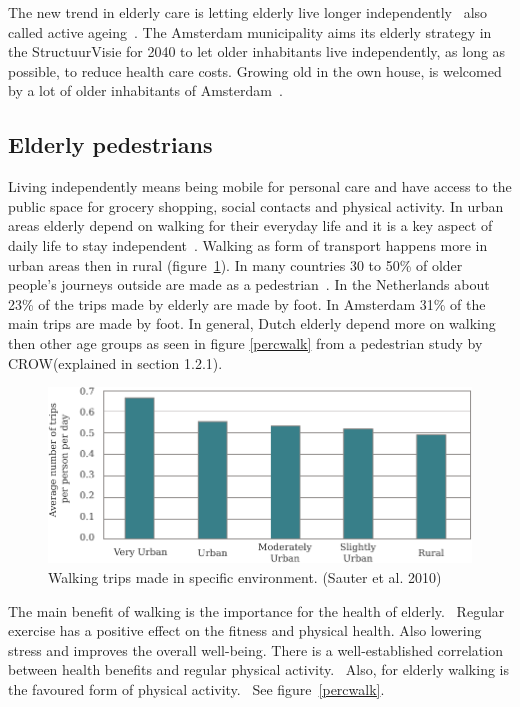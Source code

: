 The new trend in elderly care is letting elderly live longer independently~\cite{MENSenSTRAAT2014, VandeRidder2008} also called active ageing~\cite{Annear2014}. The Amsterdam municipality aims its elderly strategy in the StructuurVisie for 2040 to let older inhabitants live independently, as long as possible, to reduce health care costs. Growing old in the own house, is welcomed by a lot of older inhabitants of Amsterdam~\cite{Bossink2011}.

\subsection{Elderly pedestrians}
Living independently means being mobile for personal care and have access to the public space for grocery shopping, social contacts and physical activity. In urban areas elderly depend on walking for their everyday life and it is a key aspect of daily life to stay independent~\cite{OECD2001}. Walking as form of transport happens more in urban areas then in rural (figure~\ref{walktrip}).
In many countries 30 to 50\% of older people's journeys outside are made as a pedestrian~\cite{Stahl2013}. In the Netherlands about 23\% of the trips made by elderly are made by foot. In Amsterdam 31\% of the main trips are made by foot. In general, Dutch elderly depend more on walking then other age groups as seen in figure \ref{percwalk} from a pedestrian study by CROW(explained in section 1.2.1).~\cite{Eijnde2011, Sauter2010, Crow2014}

\begin{figure}[h]
\includegraphics[width=\textwidth]{img/I2_urbanwalks.pdf}
\centering
\caption[Walking trips made in specific environment.]{Walking trips made in specific environment. (Sauter et al. 2010)
\label{walktrip}} 
\end{figure}

The main benefit of walking is the importance for the health of elderly.~\cite{Borst2008} Regular exercise has a positive effect on the fitness and physical health. Also lowering stress and improves the overall well-being. There is a well-established correlation between health benefits and regular physical activity.~\cite{Annear2014} Also, for elderly walking is the favoured form of physical activity.~\cite{Borst2008} See figure~\ref{percwalk}.

